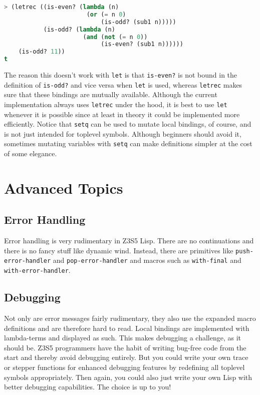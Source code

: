 \documentclass[
]{article}
\newcommand{\passthrough}[1]{#1}
\begin{document}
\begin{lstlisting}[language=Lisp]
> (letrec ((is-even? (lambda (n)
                       (or (= n 0)
                           (is-odd? (sub1 n)))))
           (is-odd? (lambda (n)
                      (and (not (= n 0))
                           (is-even? (sub1 n))))))
    (is-odd? 11))
t
\end{lstlisting}

The reason this doesn't work with \passthrough{\lstinline!let!} is that
\passthrough{\lstinline!is-even?!} is not bound in the definition of
\passthrough{\lstinline!is-odd?!} and vice versa when
\passthrough{\lstinline!let!} is used, whereas
\passthrough{\lstinline!letrec!} makes sure that these bindings are
mutually available. Although the current implementation always uses
\passthrough{\lstinline!letrec!} under the hood, it is best to use
\passthrough{\lstinline!let!} whenever it is possible since at least in
theory it could be implemented more efficiently. Notice that
\passthrough{\lstinline!setq!} can be used to mutate local bindings, of
course, and is not just intended for toplevel symbols. Although
beginners should avoid it, sometimes mutating variables with
\passthrough{\lstinline!setq!} can make definitions simpler at the cost
of some elegance.

\hypertarget{advanced-topics}{%
\section{Advanced Topics}\label{advanced-topics}}

\hypertarget{error-handling}{%
\subsection{Error Handling}\label{error-handling}}

Error handling is very rudimentary in Z3S5 Lisp. There are no
continuations and there is no fancy stuff like dynamic wind. Instead,
there are primitives like \passthrough{\lstinline!push-error-handler!}
and \passthrough{\lstinline!pop-error-handler!} and macros such as
\passthrough{\lstinline!with-final!} and
\passthrough{\lstinline!with-error-handler!}.

\hypertarget{debugging}{%
\subsection{Debugging}\label{debugging}}

Not only are error messages fairly rudimentary, they also use the
expanded macro definitions and are therefore hard to read. Local
bindings are implemented with lambda-terms and displayed as such. This
makes debugging a challenge, as it should be. Z3S5 programmers have the
habit of writing bug-free code from the start and thereby avoid
debugging entirely. But you could write your own trace or stepper
functions for enhanced debugging features by redefining all toplevel
symbols appropriately. Then again, you could also just write your own
Lisp with better debugging capabilities. The choice is up to you!
\end{document}
